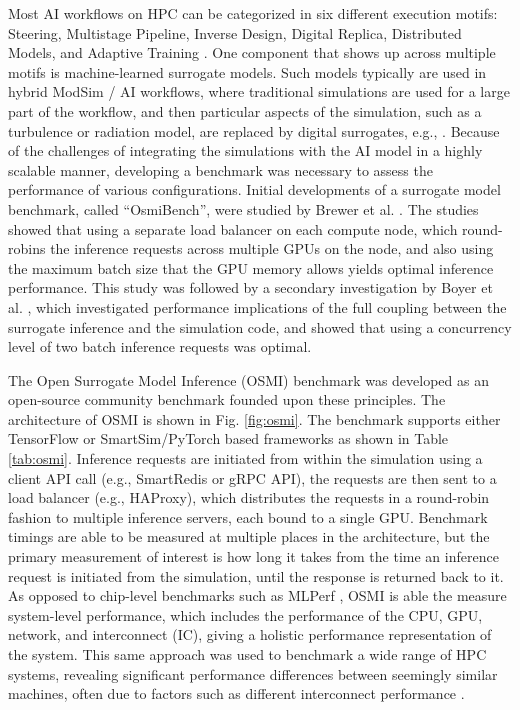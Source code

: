 \documentclass[utf8]{FrontiersinVancouver} %
\begin{document}
Most AI workflows on HPC can be categorized in six different execution motifs: Steering, Multistage Pipeline, Inverse Design, Digital Replica, Distributed Models, and Adaptive Training \cite{brewer2024ai}. One component that shows up across multiple motifs is machine-learned surrogate models. Such models typically are used in hybrid ModSim / AI workflows, where traditional simulations are used for a large part of the workflow, and then particular aspects of the simulation, such as a turbulence or radiation model, are replaced by digital surrogates, e.g., \cite{partee2022using, martinez2022roam, bhushan2023assessment}. Because of the challenges of integrating the simulations with the AI model in a highly scalable manner, developing a benchmark was necessary to assess the performance of various configurations. Initial developments of a surrogate model benchmark, called ``OsmiBench'', were studied by Brewer et al. \cite{brewer2021production}. The studies showed that using a separate load balancer on each compute node, which round-robins the inference requests across multiple GPUs on the node, and also using the maximum batch size that the GPU memory allows yields optimal inference performance. This study was followed by a secondary investigation by Boyer et al. \cite{boyer2022scalable}, which investigated performance implications of the full coupling between the surrogate inference and the simulation code, and showed that using a concurrency level of two batch inference requests was optimal. 

The Open Surrogate Model Inference (OSMI) benchmark was developed as an open-source community benchmark founded upon these principles. The architecture of OSMI is shown in Fig. \ref{fig:osmi}. The benchmark supports either TensorFlow or SmartSim/PyTorch based frameworks as shown in Table \ref{tab:osmi}. Inference requests are initiated from within the simulation using a client API call (e.g., SmartRedis or gRPC API), the requests are then sent to a load balancer (e.g., HAProxy), which distributes the requests in a round-robin fashion to multiple inference servers, each bound to a single GPU. Benchmark timings are able to be measured at multiple places in the architecture, but the primary measurement of interest is how long it takes from the time an inference request is initiated from the simulation, until the response is returned back to it. As opposed to chip-level benchmarks such as MLPerf \cite{reddi2020mlperf}, OSMI is able the measure system-level performance, which includes the performance of the CPU, GPU, network, and interconnect (IC), giving a holistic performance representation of the system. This same approach was used to benchmark a wide range of HPC systems, revealing significant performance differences between seemingly similar machines, often due to factors such as different interconnect performance \cite{brewer2020inference}.
\end{document}
